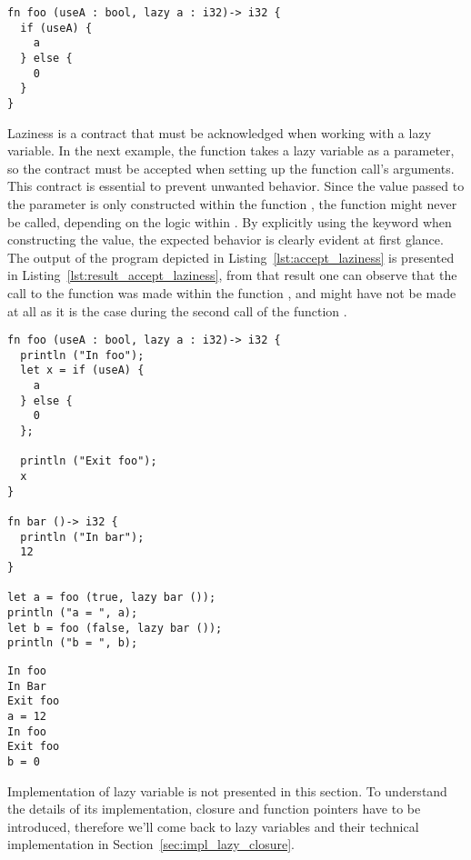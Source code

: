 \begin{lstlisting}[style=coloredverbatim]
fn foo (useA : bool, lazy a : i32)-> i32 {
  if (useA) {
    a
  } else {
    0
  }
}
\end{lstlisting}

Laziness is a contract that must be acknowledged when working with a lazy
variable. In the next example, the function  takes a lazy variable as
a parameter, so the contract must be accepted when setting up the function
call's arguments. This contract is essential to prevent unwanted behavior. Since
the value passed to the parameter  is only constructed within the
function , the function  might never be called, depending
on the logic within . By explicitly using the  keyword
when constructing the value, the expected behavior is clearly evident at first
glance. The output of the program depicted in Listing~\ref{lst:accept_laziness}
is presented in Listing~\ref{lst:result_accept_laziness}, from that result one
can observe that the call to the function  was made within the
function , and might have not be made at all as it is the case during
the second call of the function .

\begin{lstlisting}[style=coloredverbatim, label=lst:accept_laziness, caption=Example of laziness contract acceptance]
fn foo (useA : bool, lazy a : i32)-> i32 {
  println ("In foo");
  let x = if (useA) {
    a
  } else {
    0
  };

  println ("Exit foo");
  x
}

fn bar ()-> i32 {
  println ("In bar");
  12
}

let a = foo (true, lazy bar ());
println ("a = ", a);
let b = foo (false, lazy bar ());
println ("b = ", b);
\end{lstlisting}

\begin{lstlisting}[style=intermediateVerb, caption=Result of execution of Listing~\ref{lst:accept_laziness}, label=lst:result_accept_laziness]
In foo
In Bar
Exit foo
a = 12
In foo
Exit foo
b = 0
\end{lstlisting}

Implementation of lazy variable is not presented in this section. To understand
the details of its implementation, closure and function pointers have to be
introduced, therefore we'll come back to lazy variables and their technical
implementation in Section~\ref{sec:impl_lazy_closure}.

